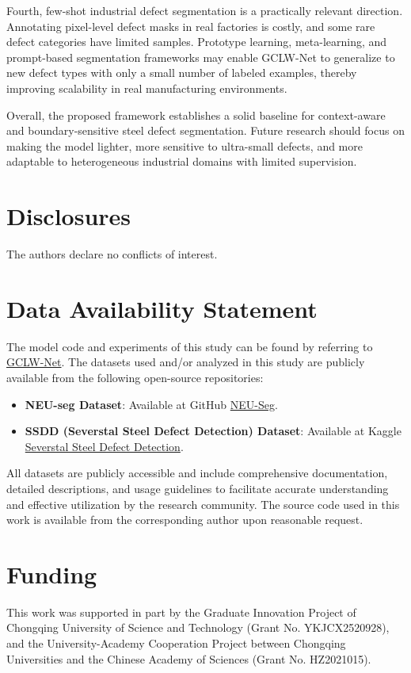 \documentclass[sn-basic]{sn-jnl}
\theoremstyle{thmstyleone}%
\theoremstyle{thmstyletwo}%
\theoremstyle{thmstylethree}%
\begin{document}
Fourth, few-shot industrial defect segmentation is a practically relevant direction. Annotating pixel-level defect masks in real factories is costly, and some rare defect categories have limited samples. Prototype learning, meta-learning, and prompt-based segmentation frameworks may enable GCLW-Net to generalize to new defect types with only a small number of labeled examples, thereby improving scalability in real manufacturing environments.

Overall, the proposed framework establishes a solid baseline for context-aware and boundary-sensitive steel defect segmentation. Future research should focus on making the model lighter, more sensitive to ultra-small defects, and more adaptable to heterogeneous industrial domains with limited supervision.




 \section{Disclosures}
 The authors declare no conflicts of interest.

\section{Data Availability Statement} 
The model code and experiments of this study can be found by referring to \href{https://github.com/zhouhy666/GCLW-UNet}{GCLW-Net}. 
The datasets used and/or analyzed in this study are publicly available from the following open-source repositories:

\begin{itemize}
    \item \textbf{NEU-seg Dataset}: Available at GitHub \href{https://github.com/DHW-Master/NEU_Seg}{NEU-Seg}.
    \item \textbf{SSDD (Severstal Steel Defect Detection) Dataset}: Available at Kaggle \href{https://www.kaggle.com/c/severstal-steel-defect-detection}{Severstal Steel Defect Detection}.
\end{itemize}

All datasets are publicly accessible and include comprehensive documentation, detailed descriptions, and usage guidelines to facilitate accurate understanding and effective utilization by the research community. The source code used in this work is available from the corresponding author upon reasonable request.

\section{Funding}
This work was supported in part by the Graduate Innovation Project of Chongqing University of Science and Technology (Grant No. YKJCX2520928), and the University-Academy Cooperation Project between Chongqing Universities and the Chinese Academy of Sciences (Grant No. HZ2021015).
\end{document}
